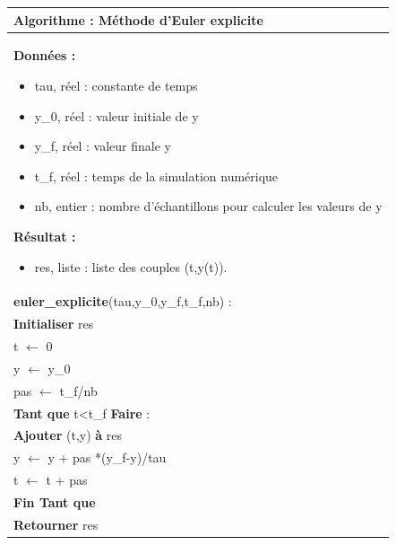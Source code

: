 \documentclass[10pt]{article}
\begin{document}
\begin{pseudo}
\begin{center}
\begin{tabular}{p{}}
\hline
\textbf{Algorithme :} Méthode d'Euler explicite\\
\hline
\textbf{Données :}
\begin{itemize}
\item \textsf{tau}, réel : constante de temps
\item \textsf{y\_0}, réel : valeur initiale de y
\item \textsf{y\_f}, réel : valeur finale y
\item \textsf{t\_f}, réel : temps de la simulation numérique
\item \textsf{nb}, entier : nombre d'échantillons pour calculer les valeurs de y
\end{itemize}
\textbf{Résultat :} 
\begin{itemize}
\item \textsf{res}, liste : liste des couples (t,y(t)).
\end{itemize}
\\
\textbf{euler\_explicite}(\textsf{tau,y\_0,y\_f,t\_f,nb}) :\\
\hspace{.4cm}\textbf{Initialiser} \textsf{res} \\
\hspace{.4cm}\textsf{t} $\leftarrow$ \textsf{0}\\
\hspace{.4cm}\textsf{y} $\leftarrow$ \textsf{y\_0}\\
\hspace{.4cm}\textsf{pas} $\leftarrow$ \textsf{t\_f/nb}\\
\hspace{.4cm}\textbf{Tant que} \textsf{t<t\_f} \textbf{Faire} :\\
\hspace{.8cm}\textbf{Ajouter} \textsf{(t,y)}  \textbf{à} \textsf{res} \\
\hspace{.8cm} \textsf{y $\leftarrow$ y + pas *(y\_f-y)/tau}\\
\hspace{.8cm} \textsf{t $\leftarrow$ t + pas}\\
\hspace{.4cm}\textbf{Fin Tant que} \\
\hspace{.4cm}\textbf{Retourner} \textsf{res}\\
\hline
\end{tabular}
\end{center}
\end{pseudo}
\end{document}
